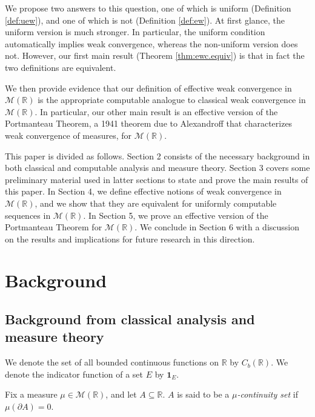 \documentclass{amsart}
\newcommand{\R}{\mathbb{R}}
\newcommand{\M}{\mathcal{M}}
\newcommand{\one}{\mathbf{1}}
\theoremstyle{definition}
\numberwithin{equation}{section}
\begin{document}
We propose two answers to this question, one of which is uniform (Definition \ref{def:uew}), and one of which is not (Definition \ref{def:ew}).  At first glance, the uniform version is much stronger.  In particular, the uniform condition automatically implies weak convergence, whereas the non-uniform version does not.  However, our first main result (Theorem \ref{thm:ewc.equiv}) is that in fact the two definitions are equivalent.  

We then provide evidence that our definition of effective weak convergence in $\M(\R)$ is the appropriate computable analogue to classical weak convergence in $\M(\R)$. 
In particular, our other main result is an effective version of the Portmanteau Theorem, a 1941 theorem due to Alexandroff \cite{A41} that characterizes weak convergence of measures, for $\M(\R)$. 

This paper is divided as follows. 
Section 2 consists of the necessary background in both classical and computable analysis and measure theory. 
Section 3 covers some preliminary material used in latter sections to state and prove the main results of this paper.
In Section 4, we define effective notions of weak convergence in $\M(\R)$, and we show that they are equivalent for uniformly computable sequences in $\M(\R)$. 
In Section 5, we prove an effective version of the Portmanteau Theorem for $\M(\R)$. 
We conclude in Section 6 with a discussion on the results and implications for future research in this direction.

\section{Background}\label{sec:back}

\subsection{Background from classical analysis and measure theory}

We denote the set of all bounded continuous functions on $\R$ by $C_b(\R)$.  
We denote the indicator function of a set $E$ by $\one_E$.

Fix a measure $\mu\in\M(\R)$, and let $A \subseteq \R$.   $A$ is said to be a \emph{$\mu$-continuity set} if $\mu(\partial A)=0$. 
\end{document}
